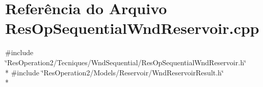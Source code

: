 \section{Referência do Arquivo Res\+Op\+Sequential\+Wnd\+Reservoir.\+cpp}
\label{_res_op_sequential_wnd_reservoir_8cpp}
{\ttfamily \#include \char`\"{}Res\+Operation2/\+Tecniques/\+Wnd\+Sequential/\+Res\+Op\+Sequential\+Wnd\+Reservoir.\+h\char`\"{}}\\*
{\ttfamily \#include \char`\"{}Res\+Operation2/\+Models/\+Reservoir/\+Wnd\+Reservoir\+Result.\+h\char`\"{}}\\*
